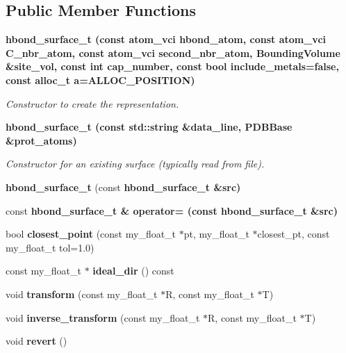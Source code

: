 \subsection*{Public Member Functions}
\begin{CompactItemize}
\item 
\bf{hbond\_\-surface\_\-t} (const atom\_\-vci hbond\_\-atom, const atom\_\-vci C\_\-nbr\_\-atom, const atom\_\-vci second\_\-nbr\_\-atom, \bf{Bounding\-Volume} \&site\_\-vol, const int cap\_\-number, const bool include\_\-metals=false, const alloc\_\-t a=ALLOC\_\-POSITION)\label{classASCbase_1_1hbond__surface__t_9e357e26963a25f5d34f8ead0e7154b8}

\begin{CompactList}\small\item\em Constructor to create the representation. \item\end{CompactList}\item 
\bf{hbond\_\-surface\_\-t} (const std::string \&data\_\-line, \bf{PDBBase} \&prot\_\-atoms)\label{classASCbase_1_1hbond__surface__t_a072af1ca67675f348af7ae0f6a9941b}

\begin{CompactList}\small\item\em Constructor for an existing surface (typically read from file). \item\end{CompactList}\item 
\textbf{hbond\_\-surface\_\-t} (const \bf{hbond\_\-surface\_\-t} \&src)\label{classASCbase_1_1hbond__surface__t_e1e229896cc8285447726191d4c8e5c2}

\item 
const \bf{hbond\_\-surface\_\-t} \& \textbf{operator=} (const \bf{hbond\_\-surface\_\-t} \&src)\label{classASCbase_1_1hbond__surface__t_c825922a0e490482d7f5362d2554beaf}

\item 
bool \textbf{closest\_\-point} (const my\_\-float\_\-t $\ast$pt, my\_\-float\_\-t $\ast$closest\_\-pt, const my\_\-float\_\-t tol=1.0)\label{classASCbase_1_1hbond__surface__t_828b634e714761ec0282112bab50d6f6}

\item 
const my\_\-float\_\-t $\ast$ \textbf{ideal\_\-dir} () const \label{classASCbase_1_1hbond__surface__t_64bcfe8ebae6a5a406fa880eabe4c0b6}

\item 
void \textbf{transform} (const my\_\-float\_\-t $\ast$R, const my\_\-float\_\-t $\ast$T)\label{classASCbase_1_1hbond__surface__t_81063d19a3920c08e846d70928f6c594}

\item 
void \textbf{inverse\_\-transform} (const my\_\-float\_\-t $\ast$R, const my\_\-float\_\-t $\ast$T)\label{classASCbase_1_1hbond__surface__t_203a7593526f7b8d8a20cb664406d6a3}

\item 
void \textbf{revert} ()\label{classASCbase_1_1hbond__surface__t_e65041fc31bbbaae6922364cfe78ae54}

\end{CompactItemize}
